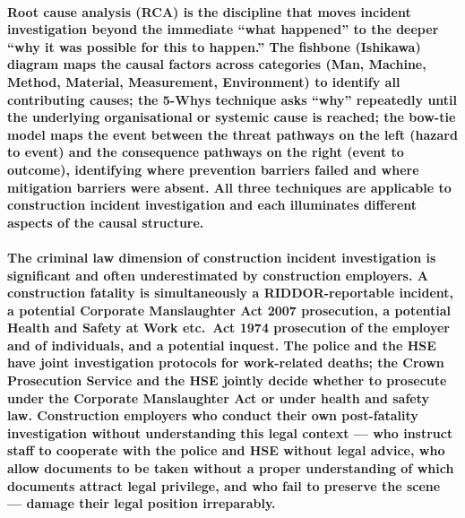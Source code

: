 \paragraph{Root cause analysis (RCA) is the discipline that moves incident investigation beyond the immediate ``what happened'' to the deeper ``why it was possible for this to happen.'' The fishbone (Ishikawa) diagram maps the causal factors across categories (Man, Machine, Method, Material, Measurement, Environment) to identify all contributing causes; the 5-Whys technique asks ``why'' repeatedly until the underlying organisational or systemic cause is reached; the bow-tie model maps the event between the threat pathways on the left (hazard to event) and the consequence pathways on the right (event to outcome), identifying where prevention barriers failed and where mitigation barriers were absent. All three techniques are applicable to construction incident investigation and each illuminates different aspects of the causal structure.}

\paragraph{The criminal law dimension of construction incident investigation is significant and often underestimated by construction employers. A construction fatality is simultaneously a RIDDOR-reportable incident, a potential Corporate Manslaughter Act 2007 prosecution, a potential Health and Safety at Work etc.\ Act 1974 prosecution of the employer and of individuals, and a potential inquest. The police and the HSE have joint investigation protocols for work-related deaths; the Crown Prosecution Service and the HSE jointly decide whether to prosecute under the Corporate Manslaughter Act or under health and safety law. Construction employers who conduct their own post-fatality investigation without understanding this legal context --- who instruct staff to cooperate with the police and HSE without legal advice, who allow documents to be taken without a proper understanding of which documents attract legal privilege, and who fail to preserve the scene --- damage their legal position irreparably.}


